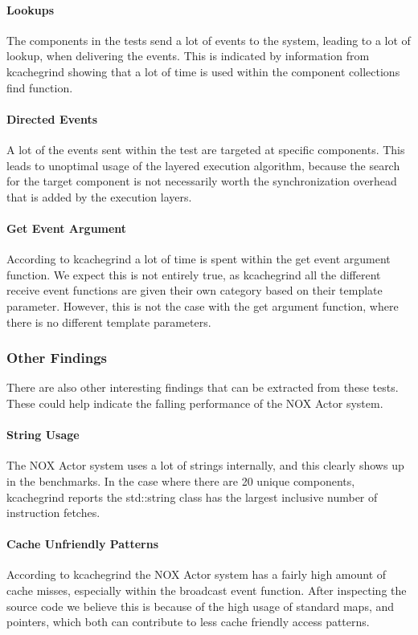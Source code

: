 \paragraph{Lookups}
The components in the tests send a lot of events to the system, leading to a lot of lookup,
when delivering the events.
This is indicated by information from kcachegrind showing that a lot of time is used within the component collections find function.

\paragraph{Directed Events}
A lot of the events sent within the test are targeted at specific components.
This leads to unoptimal usage of the layered execution algorithm, because the search for the target component
is not necessarily worth the synchronization overhead that is added by the execution layers.

\paragraph{Get Event Argument}
According to kcachegrind a lot of time is spent within the get event argument function.
We expect this is not entirely true, as kcachegrind all the different receive event functions are given
their own category based on their template parameter.
However, this is not the case with the get argument function, where there is no different template parameters.

\subsubsection{Other Findings}
There are also other interesting findings that can be extracted from these tests.
These could help indicate the falling performance of the NOX Actor system.

\paragraph{String Usage}
The NOX Actor system uses a lot of strings internally, and this clearly shows up in the benchmarks.
In the case where there are 20 unique components, kcachegrind reports the std::string class has the largest
inclusive number of instruction fetches.

\paragraph{Cache Unfriendly Patterns}
According to kcachegrind the NOX Actor system has a fairly high amount of cache misses,
especially within the broadcast event function.
After inspecting the source code we believe this is because of the high usage of standard maps, and pointers, which
both can contribute to less cache friendly access patterns.

